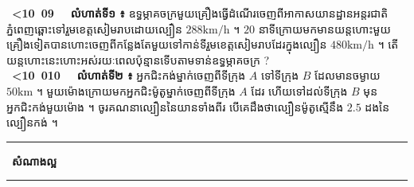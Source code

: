 \documentclass[theme=teal]{khmermath}
\def\splitnum#1#2{%
  \color{koreaNumber!65}#1\color{koreaOrange}#2%
}
\newcommand{\koreannum}[2][16]{%
  \mbox{%
    \fontsize{#1}{#1}\selectfont\bfseries%
    \ifnum#2<10\relax%
      \color{koreaNumber!65}0\color{koreaOrange}#2%
    \else%
      \expandafter\splitnum#2%
    \fi%
  }\,\ %
}
\begin{document}
\vspace{3pt}
\noindent{}\par\vspace{3pt}

\noindent
\koreannum[13]{9} \textbf{លំហាត់ទី១ ៖} ឧទ្ធម្ភាគចក្រមួយគ្រឿងធ្វើដំណើរចេញពីអាកាសយានដ្ឋានអន្តរជាតិភ្នំពេញឆ្ពោះទៅរួមខេត្តសៀមរាបដោយល្បឿន $288\text{km/h}$ ។ $20$ នាទីក្រោយមកមានយន្តហោះមួយគ្រឿងទៀតបានហោះចេញពីកន្លែងតែមួយទៅកាន់ទីរួមខេត្តសៀមរាបដែរក្នុងល្បឿន $480\text{km/h}$ ។ តើយន្តហោះនេះហោះអស់រយៈពេលប៉ុន្មានទើបតាមទាន់ឧទ្ធម្ភាគចក្រ ?\\[4pt]
\koreannum[13]{10} \textbf{លំហាត់ទី២ ៖} អ្នកជិះកង់ម្នាក់ចេញពីទីក្រុង $A$ ទៅទីក្រុង $B$ ដែលមានចម្ងាយ $50\text{km}$ ។ មួយម៉ោងក្រោយមកអ្នកជិះម៉ូតូម្នាក់ចេញពីទីក្រុង $A$ ដែរ ហើយទៅដល់ទីក្រុង $B$ មុនអ្នកជិះកង់មួយម៉ោង ។ ចូរគណនាល្បឿននៃយានទាំងពីរ បើគេដឹងថាល្បឿនម៉ូតូស្មើនឹង $2.5$ ដងនៃល្បឿនកង់ ។

\vspace{8pt}
\begin{center}
  \color{brandCrimson}\rule{0.22\textwidth}{0.8pt}\quad{}\ \textbf{\kml សំណាងល្អ}\ \quad\rule{0.22\textwidth}{0.8pt}
\end{center}
\end{document}
